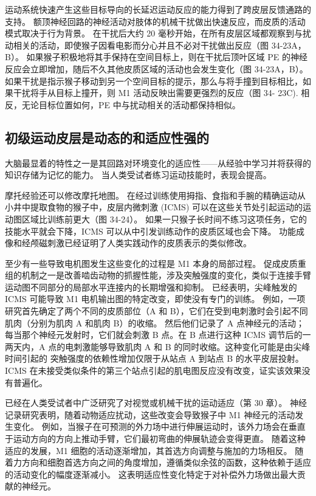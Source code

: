 运动系统快速产生这些目标导向的长延迟运动反应的能力得到了跨皮层反馈通路的支持。 额顶神经回路的神经活动对肢体的机械干扰做出快速反应，而皮质的活动模式取决于行为背景。 在干扰后大约 20 毫秒开始，在所有皮层区域都观察到与扰动相关的活动，即使猴子因看电影而分心并且不必对干扰做出反应（图 34-23A，B）。 如果猴子积极地将其手保持在空间目标上，则在干扰后顶叶区域 PE 的神经反应会立即增加，随后不久其他皮质区域的活动也会发生变化（图 34-23A，B）。 如果干扰是指示猴子移动到另一个空间目标的提示，那么与将手撞到目标相比，如果干扰将手从目标上撞开，则 M1 活动反映出需要更强烈的反应（图 34- 23C). 相反，无论目标位置如何，PE 中与扰动相关的活动都保持相似。

\subsection{初级运动皮层是动态的和适应性强的}
大脑最显着的特性之一是其回路对环境变化的适应性——从经验中学习并将获得的知识存储为记忆的能力。 当人类受试者练习运动技能时，表现会提高。

摩托经验还可以修改摩托地图。 在经过训练使用拇指、食指和手腕的精确运动从小井中提取食物的猴子中，皮层内微刺激 (ICMS) 可以在这些关节处引起运动的运动图区域比训练前更大（图 34-24）。 如果一只猴子长时间不练习这项任务，它的技能水平就会下降，ICMS 可以从中引发训练动作的皮质区域也会下降。 功能成像和经颅磁刺激已经证明了人类实践动作的皮质表示的类似修改。

至少有一些导致电机图发生这些变化的过程是 M1 本身的局部过程。 促成皮质重组的机制之一是改善啮齿动物的抓握性能，涉及突触强度的变化，类似于连接手臂运动图不同部分的局部水平连接内的长期增强和抑制。 已经表明，尖峰触发的 ICMS 可能导致 M1 电机输出图的特定改变，即使没有专门的训练。 例如，一项研究首先确定了两个不同的皮质部位（A 和 B），它们在受到电刺激时会引起不同肌肉（分别为肌肉 A 和肌肉 B）的收缩。 然后他们记录了 A 点神经元的活动； 每当那个神经元发射时，它们就会刺激 B 点。在 B 点进行这种 ICMS 调节后的一两天内，A 点的电刺激能够导致肌肉 A 和 B 的同时收缩。这种变化可能是由尖峰时间引起的 突触强度的依赖性增加仅限于从站点 A 到站点 B 的水平皮层投射。ICMS 在未接受类似条件的第三个站点引起的肌电图反应没有改变，证实该效果没有普遍化。

已经在人类受试者中广泛研究了对视觉或机械干扰的运动适应（第 30 章）。 神经记录研究表明，随着动物适应扰动，这些改变会导致猴子中 M1 神经元的活动发生变化。 例如，当猴子在可预测的外力场中进行伸展运动时，该外力场会在垂直于运动方向的方向上推动手臂，它们最初弯曲的伸展轨迹会变得更直。 随着这种适应的发展，M1 细胞的活动逐渐增加，其首选方向调整与施加的力场相反。 随着力方向和细胞首选方向之间的角度增加，遵循类似余弦的函数，这种依赖于适应的活动变化的幅度逐渐减小。 这表明适应性变化特定于对补偿外力场做出最大贡献的神经元。

